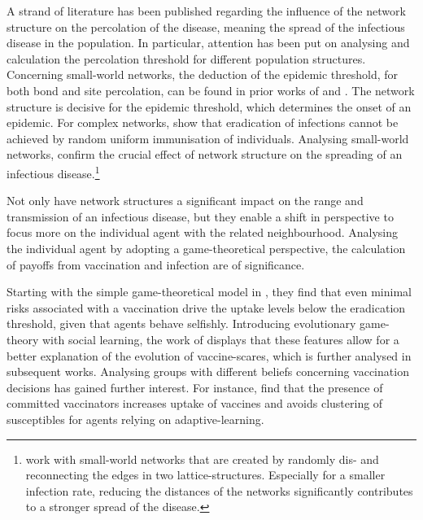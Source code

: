 \documentclass[11pt]{article}
\begin{document}
A strand of literature has been published regarding the influence of the network structure on the percolation of the disease, meaning the spread of the infectious disease in the population. In particular, attention has been put on analysing and calculation the percolation threshold for different population structures. 
Concerning small-world networks, the deduction of the epidemic threshold, for both bond and site percolation, can be found in prior works of \cite{newman1999} and \cite{moore2000}. 
The network structure is decisive for the epidemic threshold, which determines the onset of an epidemic. For complex networks, \cite{pastor2002} show that eradication of infections cannot be achieved by random uniform immunisation of individuals. 
Analysing small-world networks, \cite{liu2015} confirm the crucial effect of network structure on the spreading of an infectious disease.\footnote{\cite{liu2015} work with small-world networks that are created by randomly dis- and reconnecting the edges in two lattice-structures. Especially for a smaller infection rate, reducing the distances of the networks significantly contributes to a stronger spread of the disease.} 

Not only have network structures a significant impact on the range and transmission of an infectious disease, but they enable a shift in perspective to focus more on the individual agent with the related neighbourhood. 
Analysing the individual agent by adopting a game-theoretical perspective, the calculation of payoffs from vaccination and infection are of significance. 

Starting with the simple game-theoretical model in \cite{bauch2004}, they find that even minimal risks associated with a vaccination drive the uptake levels below the eradication threshold, given that agents behave selfishly. 
Introducing evolutionary game-theory with social learning, the work of \cite{bauch2012} displays that these features allow for a better explanation of the evolution of vaccine-scares, which is further analysed in subsequent works.
Analysing groups with different beliefs concerning vaccination decisions has gained further interest. For instance, \cite{liu2012} find that the presence of committed vaccinators increases uptake of vaccines and avoids clustering of susceptibles for agents relying on adaptive-learning.  
\end{document}
